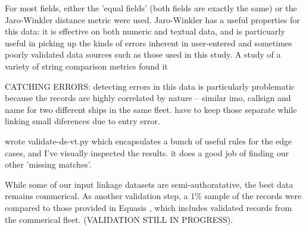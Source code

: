 For most fields, either the 'equal fields' (both fields are exactly the same) or the Jaro-Winkler distance metric were used. Jaro-Winkler has a useful properties for this data: it is effective on both numeric and textual data, and is particuarly useful in picking up the kinds of errors inherent in user-entered and sometimes poorly validated data sources such as those used in this study. A study of a variety of string comparison metrics \cite{Cohen2003} found it %

CATCHING ERRORS:
 detecting errors in this data is particularly problematic because the records are highly correlated by nature -- similar imo, callsign and name for two different ships in the same fleet. have to keep those separate while linking small diferences due to entry error.

 wrote validate-ds-vt.py which encapsulates a bunch of useful rules for the edge cases, and I've visually inspected the results. it does a good job of finding our other 'missing matches'.

While some of our input linkage datasets are semi-authoratative, the best data remains commerical. As another validation step, a 1\% sample of the records were compared to those provided in Equasis \cite{Equasis2011}, which includes validated records from the commerical fleet. (VALIDATION STILL IN PROGRESS).



